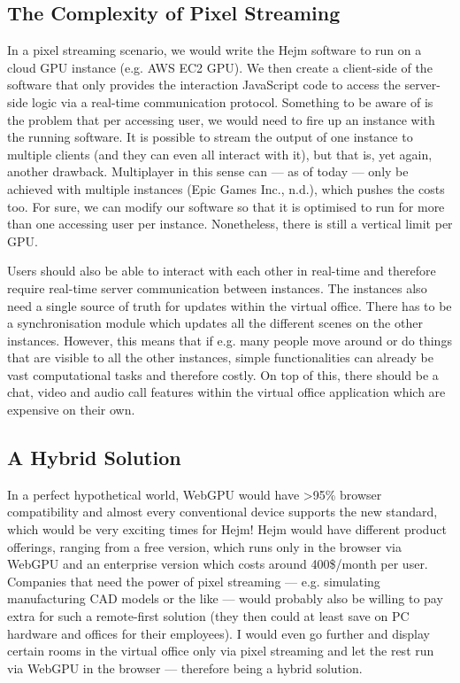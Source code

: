 \documentclass[10pt]{article}
\begin{document}
\begin{sloppypar}
  \subsection{The Complexity of Pixel Streaming}
  \label{subsec:the-complexity-of-pixel-streaming}

  In a pixel streaming scenario, we would write the Hejm software to run on a cloud GPU instance (e.g. AWS EC2 GPU). We then create a client-side of the software that only provides the interaction JavaScript code to access the server-side logic via a real-time communication protocol. Something to be aware of is the problem that per accessing user, we would need to fire up an instance with the running software. It is possible to stream the output of one instance to multiple clients (and they can even all interact with it), but that is, yet again, another drawback. Multiplayer in this sense can — as of today — only be achieved with multiple instances (Epic Games Inc., n.d.), which pushes the costs too. For sure, we can modify our software so that it is optimised to run for more than one accessing user per instance. Nonetheless, there is still a vertical limit per GPU.

  Users should also be able to interact with each other in real-time and therefore require real-time server communication between instances. The instances also need a single source of truth for updates within the virtual office. There has to be a synchronisation module which updates all the different scenes on the other instances. However, this means that if e.g. many people move around or do things that are visible to all the other instances, simple functionalities can already be vast computational tasks and therefore costly. On top of this, there should be a chat, video and audio call features within the virtual office application which are expensive on their own.

  \subsection{A Hybrid Solution}
  \label{subsec:a-hybrid-solution}

  In a perfect hypothetical world, WebGPU would have >95\% browser compatibility and almost every conventional device supports the new standard, which would be very exciting times for Hejm! Hejm would have different product offerings, ranging from a free version, which runs only in the browser via WebGPU and an enterprise version which costs around 400\$/month per user. Companies that need the power of pixel streaming — e.g. simulating manufacturing CAD models or the like — would probably also be willing to pay extra for such a remote-first solution (they then could at least save on PC hardware and offices for their employees). I would even go further and display certain rooms in the virtual office only via pixel streaming and let the rest run via WebGPU in the browser — therefore being a hybrid solution.


\end{sloppypar}
\end{document}
